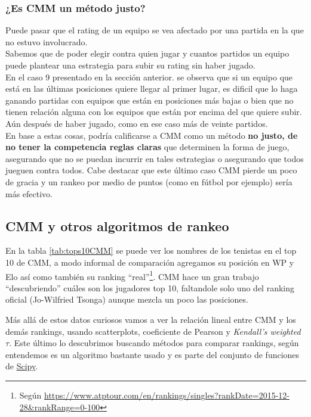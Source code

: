 \subsubsection{¿Es CMM un método justo?}

Puede pasar que el rating de un equipo se vea afectado por una partida en la que no estuvo involucrado. \\

Sabemos que de poder elegir contra quien jugar y cuantos partidos un equipo puede plantear una estrategia para subir su rating sin haber jugado.\\

En el caso 9 presentado en la sección anterior. se observa que si un equipo que está en las últimas posiciones quiere llegar al primer lugar, es dificil que lo haga ganando partidas con equipos que están en posiciones más bajas o bien que no tienen relación alguna con los equipos que están por encima del que quiere subir. Aún después de haber jugado, como en ese caso más de veinte partidos.\\

En base a estas cosas, podría calificarse a CMM como un método \textbf{no  justo, de no tener la competencia reglas claras} que determinen la forma de juego, asegurando que no se puedan incurrir en tales estrategias o asegurando que todos jueguen contra todos. Cabe destacar que este último caso CMM pierde un poco de gracia y un rankeo por medio de puntos (como en fútbol por ejemplo) sería más efectivo.

\FloatBarrier
\subsection{CMM y otros algoritmos de rankeo}
En la tabla \ref{tab:tops10CMM} se puede ver los nombres de los tenistas en el top 10 de CMM, a modo informal de comparación agregamos su posición en WP y Elo así como también su ranking ``real''\footnote{Según \url{https://www.atptour.com/en/rankings/singles?rankDate=2015-12-28&rankRange=0-100}}. CMM hace un gran trabajo ``descubriendo'' cuáles son los jugadores top 10, faltandole solo uno del ranking oficial (Jo-Wilfried Tsonga) aunque mezcla un poco las posiciones.



Más allá de estos datos curiosos vamos a ver la relación lineal entre CMM y los demás rankings, usando scatterplots, coeficiente de Pearson y \textit{Kendall’s weighted $\tau$}. Este último lo descubrimos buscando métodos para comparar rankings, según entendemos es un algoritmo bastante usado y es parte del conjunto de funciones de \href{https://docs.scipy.org/doc/scipy/reference/generated/scipy.stats.weightedtau.html}{Scipy}.

